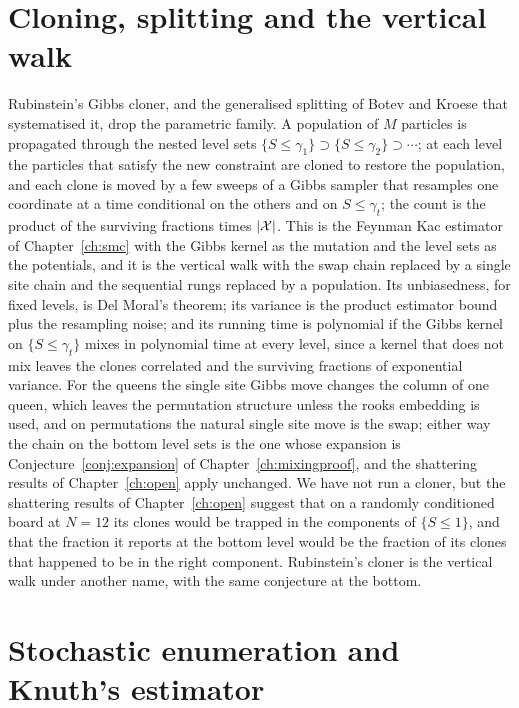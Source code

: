 \section{Cloning, splitting and the vertical walk}

Rubinstein's Gibbs cloner, and the generalised splitting of Botev and Kroese \cite{BotevKroese} that systematised it, drop the parametric family. A population of $M$ particles is propagated through the nested level sets $\{ S \le \gamma_1 \} \supset \{ S \le \gamma_2 \} \supset \cdots$; at each level the particles that satisfy the new constraint are cloned to restore the population, and each clone is moved by a few sweeps of a Gibbs sampler that resamples one coordinate at a time conditional on the others and on $S \le \gamma_t$; the count is the product of the surviving fractions times $|\mathcal{X}|$. This is the Feynman Kac estimator of Chapter~\ref{ch:smc} with the Gibbs kernel as the mutation and the level sets as the potentials, and it is the vertical walk with the swap chain replaced by a single site chain and the sequential rungs replaced by a population. Its unbiasedness, for fixed levels, is Del Moral's theorem; its variance is the product estimator bound plus the resampling noise; and its running time is polynomial if the Gibbs kernel on $\{ S \le \gamma_t \}$ mixes in polynomial time at every level, since a kernel that does not mix leaves the clones correlated and the surviving fractions of exponential variance. For the queens the single site Gibbs move changes the column of one queen, which leaves the permutation structure unless the rooks embedding is used, and on permutations the natural single site move is the swap; either way the chain on the bottom level sets is the one whose expansion is Conjecture~\ref{conj:expansion} of Chapter~\ref{ch:mixingproof}, and the shattering results of Chapter~\ref{ch:open} apply unchanged. We have not run a cloner, but the shattering results of Chapter~\ref{ch:open} suggest that on a randomly conditioned board at $N = 12$ its clones would be trapped in the components of $\{ S \le 1 \}$, and that the fraction it reports at the bottom level would be the fraction of its clones that happened to be in the right component. Rubinstein's cloner is the vertical walk under another name, with the same conjecture at the bottom.

\section{Stochastic enumeration and Knuth's estimator}

